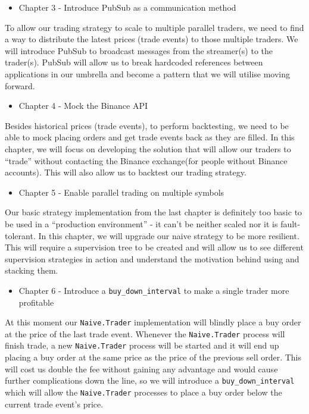 \documentclass[
  oneside]{book}
\providecommand{\tightlist}{%
  \setlength{\itemsep}{0pt}\setlength{\parskip}{0pt}}
\begin{document}
\begin{itemize}
\tightlist
\item
  Chapter 3 - Introduce PubSub as a communication method
\end{itemize}

To allow our trading strategy to scale to multiple parallel traders, we need to find a way to distribute the latest prices (trade events) to those multiple traders. We will introduce PubSub to broadcast messages from the streamer(s) to the trader(s). PubSub will allow us to break hardcoded references between applications in our umbrella and become a pattern that we will utilise moving forward.

\begin{itemize}
\tightlist
\item
  Chapter 4 - Mock the Binance API
\end{itemize}

Besides historical prices (trade events), to perform backtesting, we need to be able to mock placing orders and get trade events back as they are filled. In this chapter, we will focus on developing the solution that will allow our traders to ``trade'' without contacting the Binance exchange(for people without Binance accounts). This will also allow us to backtest our trading strategy.

\begin{itemize}
\tightlist
\item
  Chapter 5 - Enable parallel trading on multiple symbols
\end{itemize}

Our basic strategy implementation from the last chapter is definitely too basic to be used in a ``production environment'' - it can't be neither scaled nor it is fault-tolerant. In this chapter, we will upgrade our naive strategy to be more resilient. This will require a supervision tree to be created and will allow us to see different supervision strategies in action and understand the motivation behind using and stacking them.

\begin{itemize}
\tightlist
\item
  Chapter 6 - Introduce a \texttt{buy\_down\_interval} to make a single trader more profitable
\end{itemize}

At this moment our \texttt{Naive.Trader} implementation will blindly place a buy order at the price of the last trade event. Whenever the \texttt{Naive.Trader} process will finish trade, a new \texttt{Naive.Trader} process will be started and it will end up placing a buy order at the same price as the price of the previous sell order. This will cost us double the fee without gaining any advantage and would cause further complications down the line, so we will introduce a \texttt{buy\_down\_interval} which will allow the \texttt{Naive.Trader} processes to place a buy order below the current trade event's price.
\end{document}
